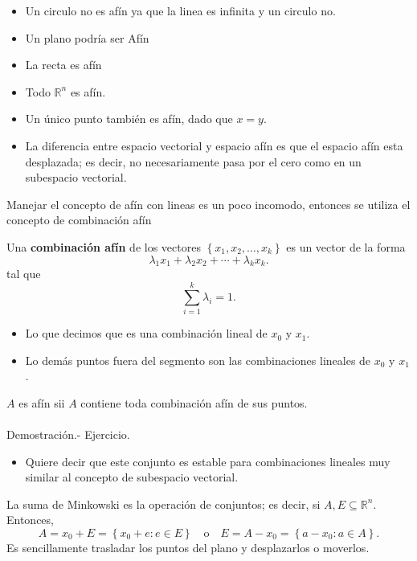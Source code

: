 \begin{itemize}
    \item Un circulo no es afín ya que la linea es infinita y un circulo no.
    \item Un plano podría ser Afín
    \item La recta es afín
    \item Todo $\mathbb{R}^n$ es afín.
    \item Un único punto también es afín, dado que $x=y$.
    \item La diferencia entre espacio vectorial y espacio afín es que el espacio afín esta desplazada; es decir, no necesariamente pasa por el cero como en un subespacio vectorial.
\end{itemize}

Manejar el concepto de afín con lineas es un poco incomodo, entonces se utiliza el concepto de combinación afín  
\begin{def.}
    Una \textbf{combinación afín} de los vectores $\left\{x_1,x_2,\ldots,x_k\right\}$ es un vector de la forma 
$$\lambda_1 x_1+\lambda_2x_2+\cdots+\lambda_kx_k.$$
tal que 
$$\sum_{i=1}^k \lambda_i = 1.$$
\end{def.}

\begin{itemize}
    \item Lo que decimos que es una combinación lineal de $x_0$ y $x_1$.
    \item Lo demás puntos fuera del segmento son las combinaciones lineales de $x_0$ y $x_1$.
\end{itemize}

\begin{teo}
    $A$ es afín sii $A$ contiene toda combinación afín de sus puntos.\\\\
    Demostración.-\; Ejercicio.
\end{teo}

\begin{itemize}
    \item Quiere decir que este conjunto es estable para combinaciones lineales muy similar al concepto de subespacio vectorial.
\end{itemize}
\vspace{.5cm}

\begin{notacion}
La suma de Minkowski es la operación de conjuntos; es decir, si $A,E\subseteq \mathbb{R}^n$. Entonces,
$$A=x_0+E=\left\{x_0+e:e\in E \right\} \quad \mbox{o}\quad E=A-x_0=\left\{a-x_0:a\in A\right\}.$$ 
Es sencillamente trasladar los puntos del plano y desplazarlos o moverlos.
\end{notacion}

